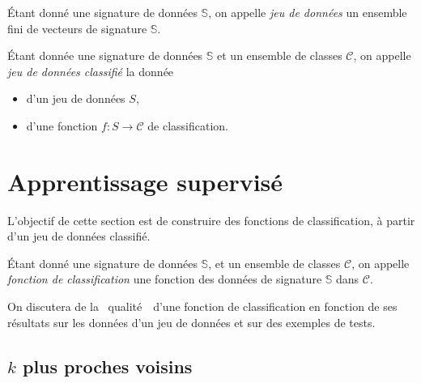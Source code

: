 \begin{defn}
	Étant donné une signature de données $\mathds{S}$, on appelle {\it jeu de données}\/ un ensemble fini de vecteurs de signature $\mathds{S}$.
\end{defn}

\begin{defn}
	Étant donnée une signature de données $\mathds{S}$\/ et un ensemble de classes $\mathcal{C}$, on appelle {\it jeu de données classifié}\/ la donnée
	\begin{itemize}
		\item d'un jeu de données $S$,
		\item d'une fonction $f: S \to \mathcal{C}$\/ de classification.
	\end{itemize}
\end{defn}

\begin{comment}
On distingue deux méthodes d'apprentissage :
\begin{enumerate}
	\item l'apprentissage supervisé où l'algorithme tente de classifier et est corrigé
	\item l'apprentissage non supervisé où l'algorithme 
\end{enumerate}
\end{comment}

\section{Apprentissage supervisé}

L'objectif de cette section est de construire des fonctions de classification, à partir d'un jeu de données classifié.

\begin{defn}
	Étant donné une signature de données $\mathds{S}$, et un ensemble de classes $\mathcal{C}$, on appelle {\it fonction de classification}\/ une fonction des données de signature $\mathds{S}$\/ dans $\mathcal{C}$.
\end{defn}

\begin{rmk}
	On discutera de la \guillemotleft~qualité~\guillemotright\ d'une fonction de classification en fonction de ses résultats sur les données d'un jeu de données et sur des exemples de tests.
\end{rmk}

\subsection{$k$\/ plus proches voisins}

